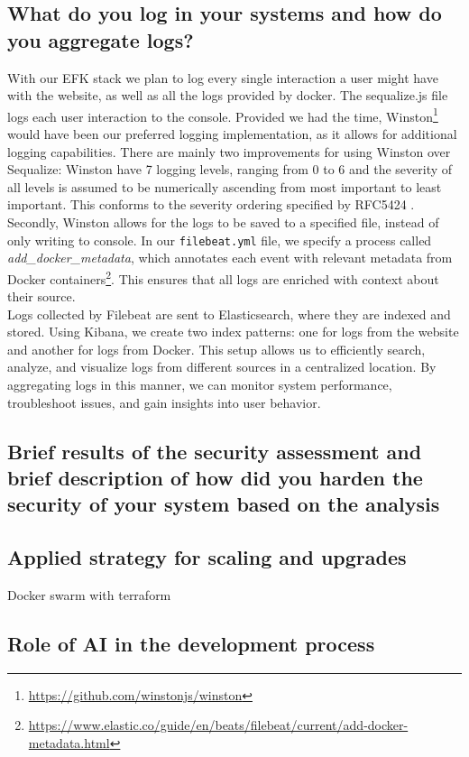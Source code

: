 \documentclass[11pt]{article}
\begin{document}
\subsection{What do you log in your systems and how do you aggregate logs?}
With our EFK stack we plan to log every single interaction a user might have with the website, as well as all the logs provided by docker. The sequalize.js file logs each user interaction to the console. Provided we had the time, Winston\footnote{\url{https://github.com/winstonjs/winston}} would have been our preferred logging implementation, as it allows for additional logging capabilities. There are mainly two improvements for using Winston over Sequalize: Winston have 7 logging levels, ranging from 0 to 6 and the severity of all levels is assumed to be numerically ascending from most important to least important. This conforms to the severity ordering specified by RFC5424 \citep{rfc5424}. Secondly, Winston allows for the logs to be saved to a specified file, instead of only writing to console. 
In our \texttt{filebeat.yml} file, we specify a process called \textit{add\_docker\_metadata}, which annotates each event with relevant metadata from Docker containers\footnote{\url{https://www.elastic.co/guide/en/beats/filebeat/current/add-docker-metadata.html}}. This ensures that all logs are enriched with context about their source.\\
Logs collected by Filebeat are sent to Elasticsearch, where they are indexed and stored. Using Kibana, we create two index patterns: one for logs from the website and another for logs from Docker. This setup allows us to efficiently search, analyze, and visualize logs from different sources in a centralized location. By aggregating logs in this manner, we can monitor system performance, troubleshoot issues, and gain insights into user behavior. 






\subsection{Brief results of the security assessment and brief description of how did you harden the security of your system based on the analysis}
\subsection{Applied strategy for scaling and upgrades}
Docker swarm with terraform
\subsection{Role of AI in the development process}
\end{document}
